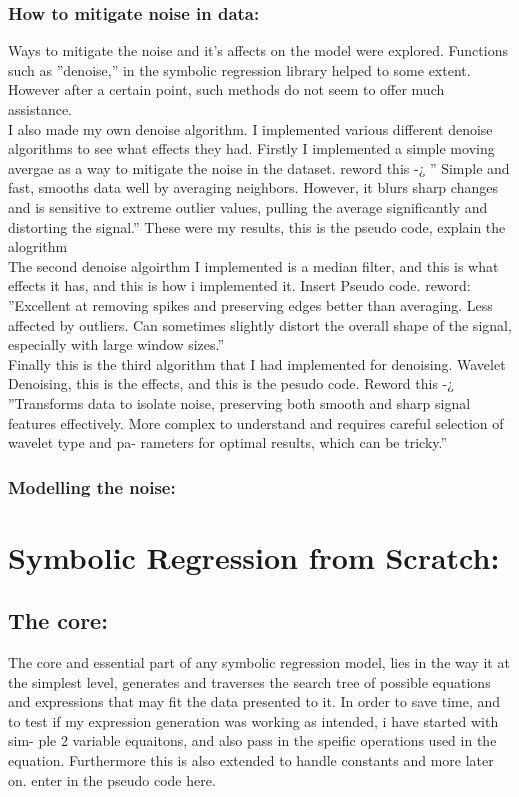 \documentclass{article}
\begin{document}
\subsubsection{How to mitigate noise in data: }
 Ways to mitigate the noise and it’s affects on the model were explored. Functions such as ”denoise,” in the
symbolic regression library helped to some extent. However after a certain point, such methods do not seem to
offer much assistance.\\
I also made my own denoise algorithm. I implemented various different denoise algorithms to see what effects
they had. Firstly I implemented a simple moving avergae as a way to mitigate the noise in the dataset. reword
this -¿ ” Simple and fast, smooths data well by averaging neighbors. However, it blurs sharp changes and is
sensitive to extreme outlier values, pulling the average significantly and distorting the signal.”
These were my results, this is the pseudo code, explain the alogrithm\\

The second denoise algoirthm I implemented is a median filter, and this is what effects it has, and this is how
i implemented it. Insert Pseudo code. reword: ”Excellent at removing spikes and preserving edges better than
averaging. Less affected by outliers. Can sometimes slightly distort the overall shape of the signal, especially
with large window sizes.”\\

Finally this is the third algorithm that I had implemented for denoising. Wavelet Denoising, this is the effects,
and this is the pesudo code. Reword this -¿ ”Transforms data to isolate noise, preserving both smooth and sharp
signal features effectively. More complex to understand and requires careful selection of wavelet type and pa-
rameters for optimal results, which can be tricky.”\\

\subsubsection{Modelling the noise: }

\section{Symbolic Regression from Scratch: }
\subsection{The core: }
The core and essential part of any symbolic regression model, lies in the way it at the simplest level, generates
and traverses the search tree of possible equations and expressions that may fit the data presented to it.
In order to save time, and to test if my expression generation was working as intended, i have started with sim-
ple 2 variable equaitons, and also pass in the speific operations used in the equation. Furthermore this is also
extended to handle constants and more later on.
enter in the pseudo code here.\\
\end{document}
